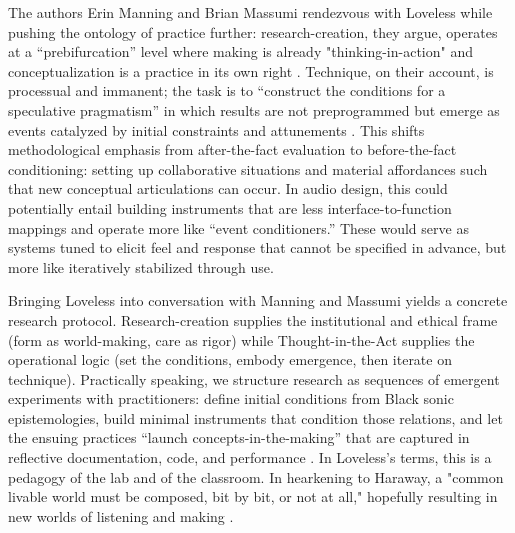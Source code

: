 The authors Erin Manning and Brian Massumi rendezvous with Loveless while pushing the ontology of practice further: research-creation, they argue, operates at a “prebifurcation” level where making is already "thinking-in-action" and conceptualization is a practice in its own right \parencite[p.~89]{Manning_Massumi_2014}. Technique, on their account, is processual and immanent; the task is to “construct the conditions for a speculative pragmatism” in which results are not preprogrammed but emerge as events catalyzed by initial constraints and attunements \parencite[p.~89]{Manning_Massumi_2014}. This shifts methodological emphasis from after-the-fact evaluation to before-the-fact conditioning: setting up collaborative situations and material affordances such that new conceptual articulations can occur. In audio design, this could potentially entail building instruments that are less interface-to-function mappings and operate more like “event conditioners.” These would serve as systems tuned to elicit feel and response that cannot be specified in advance, but more like iteratively stabilized through use.

Bringing Loveless into conversation with Manning and Massumi yields a concrete research protocol. Research-creation supplies the institutional and ethical frame (form as world-making, care as rigor) while Thought-in-the-Act supplies the operational logic (set the conditions, embody emergence, then iterate on technique). Practically speaking, we structure research as sequences of emergent experiments with practitioners: define initial conditions from Black sonic epistemologies, build minimal instruments that condition those relations, and let the ensuing practices “launch concepts-in-the-making” that are captured in reflective documentation, code, and performance \parencite[p.~89]{Manning_Massumi_2014}. In Loveless’s terms, this is a pedagogy of the lab and of the classroom. In hearkening to Haraway, a "common livable world must be composed, bit by bit, or not at all," hopefully resulting in new worlds of listening and making \parencite[p.~102]{Loveless_2019}.


